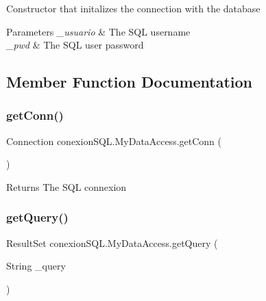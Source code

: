 Constructor that initalizes the connection with the database 
\begin{DoxyParams}{Parameters}
{\em \+\_\+usuario} & The S\+QL username \\
\hline
{\em \+\_\+pwd} & The S\+QL user password \\
\hline
\end{DoxyParams}


\subsection{Member Function Documentation}
\mbox{\label{classconexion_s_q_l_1_1_my_data_access_a3317cee8cca3bea96e915daf445e068d}} 
\subsubsection{\texorpdfstring{get\+Conn()}{getConn()}}
{\footnotesize\ttfamily Connection conexion\+S\+Q\+L.\+My\+Data\+Access.\+get\+Conn (\begin{DoxyParamCaption}{ }\end{DoxyParamCaption})\hspace{0.3cm}{\ttfamily [inline]}}

\begin{DoxyReturn}{Returns}
The S\+QL connexion 
\end{DoxyReturn}
\mbox{\label{classconexion_s_q_l_1_1_my_data_access_ae8d04039a000d2b3e7dc72c99be7c551}} 
\subsubsection{\texorpdfstring{get\+Query()}{getQuery()}}
{\footnotesize\ttfamily Result\+Set conexion\+S\+Q\+L.\+My\+Data\+Access.\+get\+Query (\begin{DoxyParamCaption}\item[{String}]{\+\_\+query }\end{DoxyParamCaption})\hspace{0.3cm}{\ttfamily [inline]}}

